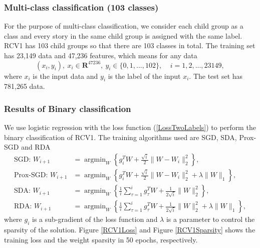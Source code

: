 \subsubsection{Multi-class classification (103 classes)}
For the purpose of multi-class classification, we consider each child group as a class and every story in the same child group is assigned with the same label. RCV1 has 103 child groups so that there are 103 classes in total. The training set has 23,149 data and 47,236 features, which means
for any data 
$$(x_i,y_i),~x_i\in \mathbf{R}^{47236},~y_i\in\{0,1,...,102\},~~~~~i=1,2,...,23149,$$
where $x_i$ is the input data and $y_i$ is the label of the input $x_i$.
The test set has 781,265 data.
\subsubsection{Results of Binary classification}
We use logistic regression with the loss function (\ref{LossTwoLabels}) to perform the binary classification of RCV1. The training algorithms used are SGD, SDA, Prox-SGD and RDA
\begin{align}
\text{SGD: }W_{i+1} &= \mathop{\arg \min}_W \left\{g_i^TW + \frac{\sqrt{i}}{2}\|W-W_i\|_2^2 \right\} ,\\ 
\text{Prox-SGD: }W_{i+1}&=\mathop{\arg \min}_W \left\{ g_i^TW + \frac{\sqrt{i}}{2}\|W-W_i\|_2^2+ \lambda\|W\|_1  \right\},\\
\text{SDA: }W_{i+1} &= \mathop{\arg \min}_W \left\{ \frac{1}{i}\sum_{\tau=1}^{i} g_{\tau}^TW + \frac{1}{2\sqrt{i}} \|W\|^2_2 \right\}, \\
\text{RDA: }W_{i+1} &=\mathop{\arg\min}_W \left\{\frac{1}{i} \sum_{\tau=1}^{i}  g_{\tau}^TW+\frac{1}{2\sqrt{i}}\|W\|^2_2+\lambda\|W\|_1 \right\}, 
\end{align} 
where $g_i$ is a sub-gradient of the loss function and $\lambda$ is a parameter to control the sparsity of the solution. Figure \ref{RCV1Loss} and Figure \ref{RCV1Sparsity} shows the training loss and the weight sparsity in 50 epochs, respectively.

